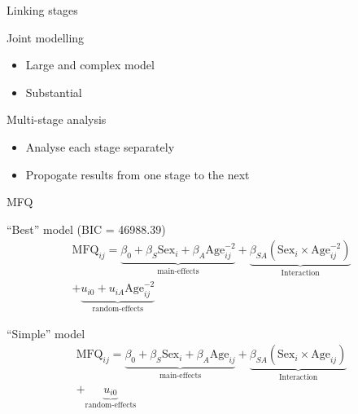 \begin{frame}{Linking stages}
  \begin{block}{Joint modelling}
    \begin{itemize}
    \item Large and complex model
    \item Substantial
    \end{itemize}    
  \end{block}

  \begin{block}{Multi-stage analysis}
    \begin{itemize}
    \item Analyse each stage separately
    \item Propogate results from one stage to the next
    \end{itemize}    
  \end{block}
  
\end{frame}


\begin{frame}{MFQ}
  
  \begin{block}{``Best'' model (BIC = 46988.39)}
    \begin{gather*}
      \text{MFQ}_{ij} = \underbrace{\beta_0 + \beta_S \text{Sex}_i +
        \beta_A \text{Age}_{ij}^{-2}}_{\text{main-effects}} +
      \underbrace{\beta_{SA}
        \left(\text{Sex}_i\times\text{Age}_{ij}^{-2}\right)}_{\text{Interaction}}
      \\+ \underbrace{u_{i0} + u_{iA}
        \text{Age}_{ij}^{-2}}_{\text{random-effects}}
    \end{gather*}
  \end{block}

  \begin{block}{``Simple'' model}
    \begin{gather*}
      \text{MFQ}_{ij} = \underbrace{\beta_0 + \beta_S \text{Sex}_i +
        \beta_A \text{Age}_{ij}}_{\text{main-effects}} +
      \underbrace{\beta_{SA}
        \left(\text{Sex}_i\times\text{Age}_{ij}\right)}_{\text{Interaction}}
      \\+ \underbrace{u_{i0}}_{\text{random-effects}}
    \end{gather*}
  \end{block}

\end{frame}

